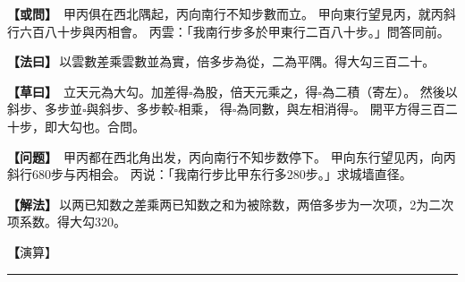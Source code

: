 \documentclass[11pt,a4paper]{article}
\let\origsquare\square
\renewcommand{\square}{\ensuremath{\origsquare}}%
\newcommand{\longline}{\noindent\rule{\textwidth}{0.4pt}}
\newcommand{\clOWEN}[1]{%
  \par\vspace{0.3em}%
  \noindent\textcolor{problemcolor}{\textbf{【或問】}}\,{\tradfont #1}\par\nopagebreak%
}
\newcommand{\mdOWEN}[1]{%
  \par\vspace{0.3em}%
  \noindent\textcolor{problemcolor}{\textbf{【问题】}}\,{\modfont #1}\par\nopagebreak%
}
\newcommand{\clFAYUE}[1]{%
  \par\noindent\textcolor{methodcolor}{\textbf{【法曰】}}\,{\tradfont #1}\par\nopagebreak%
}
\newcommand{\mdFAYUE}[1]{%
  \par\noindent\textcolor{methodcolor}{\textbf{【解法】}}\,{\modfont #1}\par\nopagebreak%
}
\newcommand{\clTSAOYUE}[1]{%
  \par\noindent\textcolor{workcolor}{\textbf{【草曰】}}\,{\tradfont #1}\par%
}
\newcommand{\mdTSAOYUE}[1]{%
  \par\noindent\textcolor{workcolor}{\textbf【演算】}}\,{\modfont #1}\par%
\begin{document}
\begin{paracol}{2}

\begin{leftcolumn}
\clOWEN{%
甲丙俱在西北隅起，丙向南行不知步數而立。
甲向東行望見丙，就丙斜行六百八十步與丙相會。
丙雲：「我南行步多於甲東行二百八十步。」問答同前。}

\clFAYUE{以雲數差乘雲數並為實，倍多步為從，二為平隅。得大勾三百二十。}

\clTSAOYUE{%
立天元為大勾。加差得$\square$為股，倍天元乘之，得$\square$為二積（寄左）。
然後以斜步、多步並$\square$與斜步、多步較$\square$相乘，
得$\square$為同數，與左相消得$\square$。
開平方得三百二十步，即大勾也。合問。}
\end{leftcolumn}

\switchcolumn

\begin{rightcolumn}
\mdOWEN{%
甲丙都在西北角出发，丙向南行不知步数停下。
甲向东行望见丙，向丙斜行680步与丙相会。
丙说：「我南行步比甲东行多280步。」求城墙直径。}

\mdFAYUE{以两已知数之差乘两已知数之和为被除数，两倍多步为一次项，2为二次项系数。得大勾320。}

\mdTSAOYUE{%
设天元为大勾。加差得$\square$为股，两倍天元乘之得$\square$为两倍积（寄左）。
然后斜步与多步之和$\square$与斜步和多步之差$\square$相乘，
得$\square$为同数，与左式相消得$\square$。
开平方得320步，即大勾。符合所问。}
\end{rightcolumn}

\end{paracol}

\vspace{0.3cm}
\begin{center}\longline\end{center}
\end{document}

